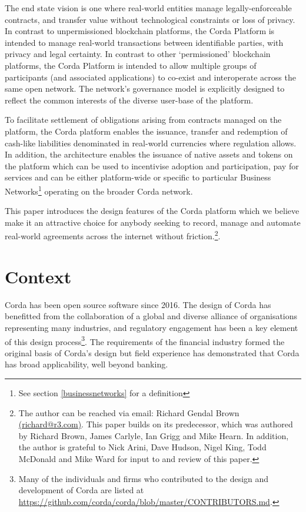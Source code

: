 \documentclass{article}
\begin{document}
The end state vision is one where real-world entities manage legally-enforceable contracts, and transfer value without technological constraints or loss of privacy. In contrast to unpermissioned blockchain platforms, the Corda Platform is intended to manage real-world transactions between identifiable parties, with privacy and legal certainty. In contrast to other `permissioned' blockchain platforms, the Corda Platform is intended to allow multiple groups of participants (and associated applications) to co-exist and interoperate across the same open network. The network's governance model is explicitly designed to reflect the common interests of the diverse user-base of the platform.

To facilitate settlement of obligations arising from contracts managed on the platform, the Corda platform enables the issuance, transfer and redemption of cash-like liabilities denominated in real-world currencies where regulation allows. In addition, the architecture enables the issuance of native assets and tokens on the platform which can be used to incentivise adoption and participation, pay for services and can be either platform-wide or specific to particular Business Networks\footnote{See section \ref{businessnetworks} for a definition} operating on the broader Corda network.

This paper introduces the design features of the Corda platform which we believe make it an attractive choice for anybody seeking to record, manage and automate real-world agreements across the internet without friction.\footnote{The author can be reached via email: Richard Gendal Brown \href{mailto:richard@r3.com}{(richard@r3.com)}. This paper builds on its predecessor, which was  authored by Richard Brown, James Carlyle, Ian Grigg and Mike Hearn. In addition, the author is grateful to Nick Arini, Dave Hudson, Nigel King, Todd McDonald and Mike Ward for input to and review of this paper.}.

\section{Context}
Corda has been open source software since 2016. The design of Corda has benefitted from the collaboration of a global and diverse alliance of organisations representing many industries, and regulatory engagement has been a key element of this design process\footnote{Many of the individuals and firms who contributed to the design and development of Corda are listed at \url{https://github.com/corda/corda/blob/master/CONTRIBUTORS.md}.}. The requirements of the financial industry formed the original basis of Corda's design but field experience has demonstrated that Corda has broad applicability, well beyond banking.
\end{document}
